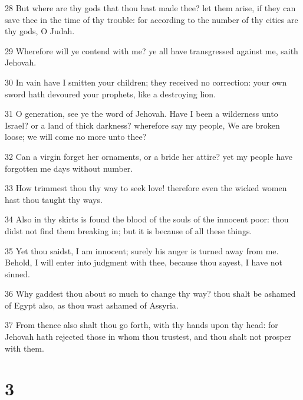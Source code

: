 \par 28 But where are thy gods that thou hast made thee? let them arise, if they can save thee in the time of thy trouble: for according to the number of thy cities are thy gods, O Judah.
\par 29 Wherefore will ye contend with me? ye all have transgressed against me, saith Jehovah.
\par 30 In vain have I smitten your children; they received no correction: your own sword hath devoured your prophets, like a destroying lion.
\par 31 O generation, see ye the word of Jehovah. Have I been a wilderness unto Israel? or a land of thick darkness? wherefore say my people, We are broken loose; we will come no more unto thee?
\par 32 Can a virgin forget her ornaments, or a bride her attire? yet my people have forgotten me days without number.
\par 33 How trimmest thou thy way to seek love! therefore even the wicked women hast thou taught thy ways.
\par 34 Also in thy skirts is found the blood of the souls of the innocent poor: thou didst not find them breaking in; but it is because of all these things.
\par 35 Yet thou saidst, I am innocent; surely his anger is turned away from me. Behold, I will enter into judgment with thee, because thou sayest, I have not sinned.
\par 36 Why gaddest thou about so much to change thy way? thou shalt be ashamed of Egypt also, as thou wast ashamed of Assyria.
\par 37 From thence also shalt thou go forth, with thy hands upon thy head: for Jehovah hath rejected those in whom thou trustest, and thou shalt not prosper with them.

\chapter{3}

